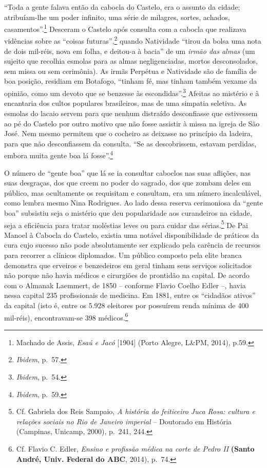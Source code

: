 ``Toda a gente falava então da cabocla do Castelo, era o assunto da
cidade; atribuíam-lhe um poder infinito, uma série de milagres, sortes,
achados, casamentos''.\footnote{Machado de Assis, \emph{Esaú e Jacó}
  {[}1904{]} (Porto Alegre, L\&PM, 2014), p.59.} Desceram o Castelo após
consulta com a cabocla que realizava vidências sobre as ``coisas
futuras'',\footnote{\emph{Ibidem}, p.~57.} quando Natividade ``tirou da
bolsa uma nota de dois mil-réis, nova em folha, e deitou-a à bacia'' de
um \emph{irmão das almas} (um sujeito que recolhia esmolas para as almas
negligenciadas, mortos desconsolados, sem missa ou sem cerimônia). As
irmãs Perpétua e Natividade são de família de boa posição, residiam em
Botafogo, ``tinham fé, mas tinham também vexame da opinião, como um
devoto que se benzesse às escondidas''.\footnote{\emph{Ibidem}, p.~54.}
Afeitas ao mistério e à encantaria dos cultos populares brasileiros, mas
de uma simpatia seletiva. As esmolas do lacaio servem para que nenhum
distraído desconfiasse que estivessem ao pé do Castelo por outro motivo
que não fosse assistir à missa na igreja de São José. Nem mesmo permitem
que o cocheiro as deixasse no princípio da ladeira, para que não
desconfiassem da consulta. ``Se as descobrissem, estavam perdidas,
embora muita gente boa lá fosse''.\footnote{\emph{Ibidem}, p.~59.}

O número de ``gente boa'' que lá se ia consultar caboclos nas suas
aflições, nas suas desgraças, dos que creem no poder do sagrado, dos que
zombam deles em público, mas ocultamente os requisitam e consultam, era
um número incalculável, como lembra mesmo Nina Rodrigues. Ao lado dessa
reserva cerimoniosa da ``gente boa'' subsistiu seja o mistério que deu
popularidade aos curandeiros na cidade, seja a eficiência para tratar
moléstias leves ou para cuidar das sérias.\footnote{Cf. Gabriela dos
  Reis Sampaio, \emph{A história do feiticeiro Juca Rosa: cultura e
  relações sociais no Rio de Janeiro imperial} -- Doutorado em História
  (Campinas, Unicamp, 2000), p.~241, 244.} De Pai Manoel à Cabocla do
Castelo, existia uma notável disponibilidade de práticos da cura cujo
sucesso não pode absolutamente ser explicado pela carência de recursos
para recorrer a clínicos diplomados. Um público composto pela elite
branca demonstra que erveiros e benzedeiros em geral tinham seus
serviços solicitados não porque não havia médicos e cirurgiões de
prontidão na capital. De acordo com o Almanak Laemmert, de 1850 --
conforme Flavio Coelho Edler --, havia nessa capital 235 profissionais
de medicina. Em 1881, entre os ``cidadãos ativos'' da capital (isto é,
entre os 5.928 eleitores por possuírem renda mínima de 400 mil-réis),
encontravam-se 398 médicos.\footnote{Cf. Flavio C. Edler, \emph{Ensino e
  profissão médica na corte de Pedro II} \textbf{(Santo André, Univ.
  Federal do ABC}, 2014), p.~74.}

